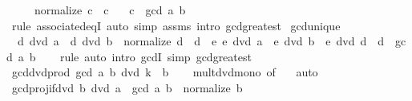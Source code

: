 \begin{isabellebody}
\ \ \ \ \ {\isachardoublequoteopen}normalize\ c\ {\isacharequal}{\kern0pt}\ c{\isachardoublequoteclose}\isanewline
\ \ \ {\isachardoublequoteopen}c\ {\isacharequal}{\kern0pt}\ gcd\ a\ b{\isachardoublequoteclose}\isanewline
%
\isadelimproof
\ \ %
\endisadelimproof
%
\isatagproof
{}\isamarkupfalse%
\ {\isacharparenleft}{\kern0pt}rule\ associated{\isacharunderscore}{\kern0pt}eqI{\isacharparenright}{\kern0pt}\ {\isacharparenleft}{\kern0pt}auto\ simp{\isacharcolon}{\kern0pt}\ assms\ intro{\isacharcolon}{\kern0pt}\ gcd{\isacharunderscore}{\kern0pt}greatest{\isacharparenright}{\kern0pt}%
\endisatagproof
{\isafoldproof}%
%
\isadelimproof
\isanewline
%
\endisadelimproof
\isanewline
{}\isamarkupfalse%
\ gcd{\isacharunderscore}{\kern0pt}unique{\isacharcolon}{\kern0pt}\isanewline
\ \ {\isachardoublequoteopen}d\ dvd\ a\ {\isasymand}\ d\ dvd\ b\ {\isasymand}\ normalize\ d\ {\isacharequal}{\kern0pt}\ d\ {\isasymand}\ {\isacharparenleft}{\kern0pt}{\isasymforall}e{\isachardot}{\kern0pt}\ e\ dvd\ a\ {\isasymand}\ e\ dvd\ b\ {\isasymlongrightarrow}\ e\ dvd\ d{\isacharparenright}{\kern0pt}\ {\isasymlongleftrightarrow}\ d\ {\isacharequal}{\kern0pt}\ gcd\ a\ b{\isachardoublequoteclose}\isanewline
%
\isadelimproof
\ \ %
\endisadelimproof
%
\isatagproof
{}\isamarkupfalse%
\ rule\ {\isacharparenleft}{\kern0pt}auto\ intro{\isacharcolon}{\kern0pt}\ gcdI\ simp{\isacharcolon}{\kern0pt}\ gcd{\isacharunderscore}{\kern0pt}greatest{\isacharparenright}{\kern0pt}%
\endisatagproof
{\isafoldproof}%
%
\isadelimproof
\isanewline
%
\endisadelimproof
\isanewline
{}\isamarkupfalse%
\ gcd{\isacharunderscore}{\kern0pt}dvd{\isacharunderscore}{\kern0pt}prod{\isacharcolon}{\kern0pt}\ {\isachardoublequoteopen}gcd\ a\ b\ dvd\ k\ {\isacharasterisk}{\kern0pt}\ b{\isachardoublequoteclose}\isanewline
%
\isadelimproof
\ \ %
\endisadelimproof
%
\isatagproof
{}\isamarkupfalse%
\ mult{\isacharunderscore}{\kern0pt}dvd{\isacharunderscore}{\kern0pt}mono\ {\isacharbrackleft}{\kern0pt}of\ {}{\isacharbrackright}{\kern0pt}\ \isamarkupfalse%
\ auto%
\endisatagproof
{\isafoldproof}%
%
\isadelimproof
\isanewline
%
\endisadelimproof
\isanewline
{}\isamarkupfalse%
\ gcd{\isacharunderscore}{\kern0pt}proj{}{\isacharunderscore}{\kern0pt}if{\isacharunderscore}{\kern0pt}dvd{\isacharcolon}{\kern0pt}\ {\isachardoublequoteopen}b\ dvd\ a\ {\isasymLongrightarrow}\ gcd\ a\ b\ {\isacharequal}{\kern0pt}\ normalize\ b{\isachardoublequoteclose}\isanewline
%
\isadelimproof
\ \ %

\end{isabellebody}
